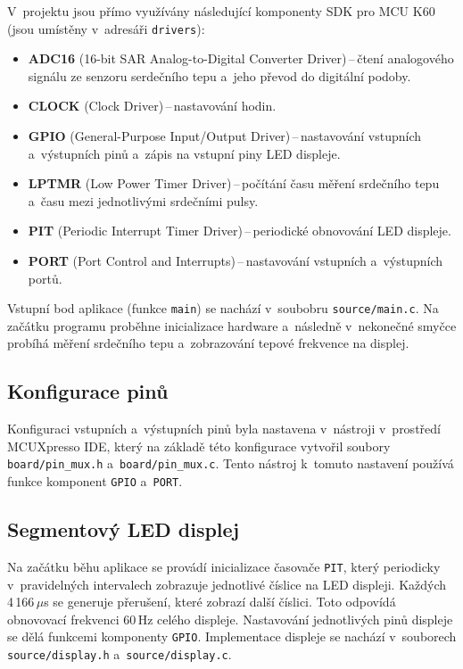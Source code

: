 \documentclass[a4paper, 11pt, twocolumn]{article}
\begin{document}
	V~projektu jsou přímo využívány následující komponenty SDK pro MCU K60
	(jsou umístěny v~adresáři \texttt{drivers}):
	\begin{itemize}
		\item
			\textbf{ADC16} (16-bit SAR Analog-to-Digital Converter
			Driver)\,--\,čtení analogového signálu ze senzoru serdečního tepu
			a~jeho převod do digitální podoby.

		\item
			\textbf{CLOCK} (Clock Driver)\,--\,nastavování hodin.

		\item
			\textbf{GPIO} (General-Purpose Input/Output Driver)\,--\,nastavování
			vstupních a~výstupních pinů a~zápis na vstupní piny LED
			displeje.

		\item
			\textbf{LPTMR} (Low Power Timer Driver)\,--\,počítání času měření
			srdečního tepu a~času mezi jednotlivými srdečními pulsy.

		\item
			\textbf{PIT} (Periodic Interrupt Timer Driver)\,--\,periodické
			obnovování LED displeje.

		\item
			\textbf{PORT} (Port Control and Interrupts)\,--\,nastavování
			vstupních a~výstupních portů.
	\end{itemize}

	Vstupní bod aplikace (funkce \texttt{main}) se nachází v~soubobru
	\texttt{source/main.c}. Na začátku programu proběhne inicializace
	hardware a~následně v~nekonečné smyčce probíhá měření srdečního tepu
	a~zobrazování tepové frekvence na displej.


	\subsection{Konfigurace pinů}

	Konfiguraci vstupních a~výstupních pinů byla nastavena v~nástroji
	v~prostředí MCUXpresso IDE, který na základě této konfigurace vytvořil
	soubory \texttt{board/pin\_mux.h} a~\texttt{board/pin\_mux.c}. Tento nástroj
	k~tomuto nastavení používá funkce komponent \texttt{GPIO} a~\texttt{PORT}.


	\subsection{Segmentový LED displej}

	Na začátku běhu aplikace se provádí inicializace časovače \texttt{PIT},
	který periodicky v~pravidelných intervalech zobrazuje jednotlivé číslice
	na LED displeji. Každých 4\,166\,$ \mu $s se generuje přerušení, které
	zobrazí další číslici. Toto odpovídá obnovovací frekvenci 60\,Hz celého
	displeje. Nastavování jednotlivých pinů displeje se dělá funkcemi
	komponenty \texttt{GPIO}. Implementace displeje se nachází v~souborech
	\texttt{source/display.h} a~\texttt{source/display.c}.
\end{document}
